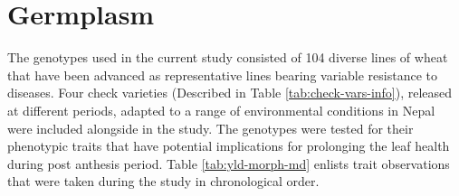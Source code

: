 \documentclass[12pt,oneside]{dukestatscithesis} %
\theoremstyle{definition}
\theoremstyle{definition}
\theoremstyle{definition}
\theoremstyle{remark}
\begin{document}
\section{Germplasm}\label{germplasm}

The genotypes used in the current study consisted of 104 diverse lines
of wheat that have been advanced as representative lines bearing
variable resistance to diseases. Four check varieties (Described in
Table \ref{tab:check-vars-info}), released at different periods, adapted
to a range of environmental conditions in Nepal were included alongside
in the study. The genotypes were tested for their phenotypic traits that
have potential implications for prolonging the leaf health during post
anthesis period. Table \ref{tab:yld-morph-md} enlists trait observations
that were taken during the study in chronological order.
\end{document}
